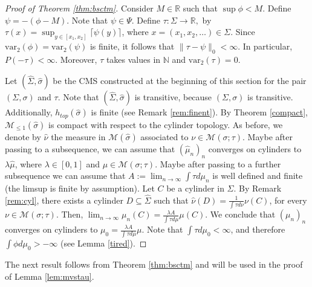 \documentclass[letterpaper,11pt]{amsart}
\theoremstyle{plain}
\theoremstyle{plain}
\theoremstyle{definition}
\theoremstyle{remark}
\def\R{{\mathbb R}}
\def\M{{\mathcal M}}
\begin{document}
\begin{proof}[Proof of Theorem \ref{thm:bsctm}] Consider $M \in \mathbb{R}$ such that $\sup \phi < M$. Define $\psi = -(\phi - M)$. Note that $\psi \in \Psi$. Define $\tau:\Sigma\to\R,$ by $\tau(x) = \sup_{y \in [x_1, x_2]} \lceil \psi(y) \rceil$, where $x = (x_1, x_2, \ldots)\in\Sigma$. Since $\text{var}_2(\phi)=\text{var}_2(\psi)$ is finite, it follows that $\|\tau - \psi\|_0 < \infty$. In particular, $P(-\tau)<\infty$. Moreover, $\tau$ takes values in $\mathbb{N}$ and $\text{var}_2(\tau) = 0$. 

Let $(\widehat{\Sigma}, \widehat{\sigma})$ be the CMS constructed at the beginning of this section for the pair $(\Sigma, \sigma)$ and $\tau$. Note that $(\widehat{\Sigma},\widehat{\sigma})$ is transitive, because $(\Sigma,\sigma)$ is transitive. Additionally, $h_{top}(\widehat{\sigma})$ is finite (see Remark \ref{rem:finent}). By Theorem \ref{compact}, $\M_{\le1}(\widehat{\sigma})$  is compact with respect to the cylinder topology. As before, we denote by $\widehat{\nu}$ the measure in $\M(\widehat{\sigma})$ associated to $\nu\in \M(\sigma;\tau)$. Maybe after passing to a subsequence, we can assume that $(\widehat{\mu}_n)_n$ converges on cylinders to $\lambda \widehat{\mu}$, where $\lambda\in [0,1]$ and $\mu\in \M(\sigma;\tau)$. Maybe after passing to a further subsequence we can assume that $A:=\lim_{n\to\infty}\int \tau d\mu_n$ is well defined and finite (the limsup is finite by assumption).  Let $C$ be a cylinder in $\Sigma$. By Remark \ref{rem:cyl}, there exists a cylinder $D\subseteq \widehat{\Sigma}$ such that $\widehat{\nu}(D)=\frac{1}{\int \tau d\nu}\nu(C)$, for every $\nu\in\M(\sigma;\tau)$. Then,
$\lim_{n\to\infty}\mu_n(C)= \frac{\lambda A}{\int \tau d\mu}\mu(C).$ We conclude that $(\mu_n)_n$ converges on cylinders to $\mu_0=\frac{\lambda A}{\int \tau d\mu}\mu$.  Note that $\int \tau d{\mu_0}<\infty$, and therefore $\int \phi d{\mu}_0>-\infty$ (see Lemma \ref{tired}). \end{proof}



The next result follows from Theorem \ref{thm:bsctm} and will be used in the proof of Lemma \ref{lem:mvstau}.
\end{document}
